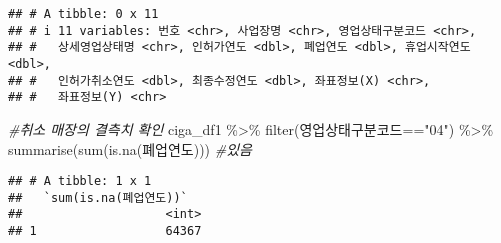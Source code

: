 \documentclass[
]{book}
\newenvironment{Shaded}{\begin{snugshade}}{\end{snugshade}}
\newcommand{\CommentTok}[1]{\textcolor[rgb]{0.56,0.35,0.01}{\textit{#1}}}
\newcommand{\FunctionTok}[1]{\textcolor[rgb]{0.00,0.00,0.00}{#1}}
\newcommand{\NormalTok}[1]{#1}
\newcommand{\OtherTok}[1]{\textcolor[rgb]{0.56,0.35,0.01}{#1}}
\newcommand{\SpecialCharTok}[1]{\textcolor[rgb]{0.00,0.00,0.00}{#1}}
\newcommand{\StringTok}[1]{\textcolor[rgb]{0.31,0.60,0.02}{#1}}
\begin{document}
\begin{verbatim}
## # A tibble: 0 x 11
## # i 11 variables: 번호 <chr>, 사업장명 <chr>, 영업상태구분코드 <chr>,
## #   상세영업상태명 <chr>, 인허가연도 <dbl>, 폐업연도 <dbl>, 휴업시작연도 <dbl>,
## #   인허가취소연도 <dbl>, 최종수정연도 <dbl>, 좌표정보(X) <chr>,
## #   좌표정보(Y) <chr>
\end{verbatim}

\begin{Shaded}
\begin{Highlighting}[]
    \CommentTok{\#취소 매장의 결측치 확인}
\NormalTok{    ciga\_df1 }\SpecialCharTok{\%\textgreater{}\%} 
      \FunctionTok{filter}\NormalTok{(영업상태구분코드}\SpecialCharTok{==}\StringTok{"04"}\NormalTok{) }\SpecialCharTok{\%\textgreater{}\%} 
      \FunctionTok{summarise}\NormalTok{(}\FunctionTok{sum}\NormalTok{(}\FunctionTok{is.na}\NormalTok{(폐업연도))) }\CommentTok{\#있음}
\end{Highlighting}
\end{Shaded}

\begin{verbatim}
## # A tibble: 1 x 1
##   `sum(is.na(폐업연도))`
##                    <int>
## 1                  64367
\end{verbatim}

\begin{Shaded}
\end{Shaded}
\end{document}
